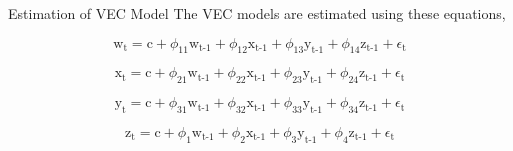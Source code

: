 \documentclass{beamer}
\newcommand{\varGasoline}{w}
\newcommand{\varGasoil}{x}
\newcommand{\varKerosene}{y}
\newcommand{\varLpg}{z}
\newcommand{\subTT}[2]{\text{#1}_{\text{#2}}}
\newcommand{\subNT}[2]{#1_{\text{#2}}}
\begin{document}
	\begin{frame}{Estimation of VEC Model}
		The VEC models are estimated using these equations,
		
		\begin{equation}
			\subTT{\varGasoline}{t} = \text{c} + \subNT{\phi}{11}\subTT{\varGasoline}{t-1} + \subNT{\phi}{12}\subTT{\varGasoil}{t-1} + \subNT{\phi}{13}\subTT{\varKerosene}{t-1} + \subNT{\phi}{14}\subTT{\varLpg}{t-1} + \subNT{\epsilon}{t} 
			\label{model:model_gasoline}
		\end{equation}
		
		\begin{equation}
			\subTT{\varGasoil}{t} = \text{c} + \subNT{\phi}{21}\subTT{\varGasoline}{t-1} + \subNT{\phi}{22}\subTT{\varGasoil}{t-1} + \subNT{\phi}{23}\subTT{\varKerosene}{t-1} + \subNT{\phi}{24}\subTT{\varLpg}{t-1} + \subNT{\epsilon}{t} 
			\label{model:model_gasoil}
		\end{equation}
		
		\begin{equation}
			\subTT{\varKerosene}{t} = \text{c} + \subNT{\phi}{31}\subTT{\varGasoline}{t-1} + \subNT{\phi}{32}\subTT{\varGasoil}{t-1} + \subNT{\phi}{33}\subTT{\varKerosene}{t-1} + \subNT{\phi}{34}\subTT{\varLpg}{t-1} + \subNT{\epsilon}{t} 
			\label{model:model_kerosene}
		\end{equation}
	
		\begin{equation}
			\subTT{\varLpg}{t} = \text{c} + \subNT{\phi}{1}\subTT{\varGasoline}{t-1} + \subNT{\phi}{2}\subTT{\varGasoil}{t-1} + \subNT{\phi}{3}\subTT{\varKerosene}{t-1} + \subNT{\phi}{4}\subTT{\varLpg}{t-1} + \subNT{\epsilon}{t} 
			\label{model:model_lpg}
		\end{equation}
	\end{frame}
\end{document}
